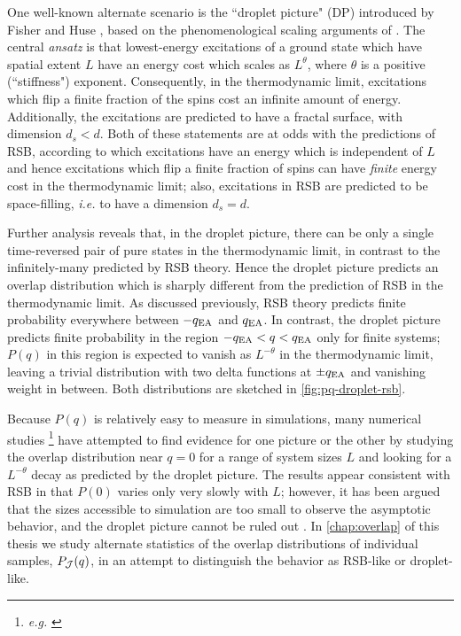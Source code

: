 One well-known alternate scenario is the ``droplet picture" (DP) introduced by
Fisher and Huse
\autocite{fisher1986ordered,fisher1987absence,fisher1988equilibrium},
based on the phenomenological scaling arguments of
\textcite{mcmillan1984scaling}. The central \textit{ansatz} is that
lowest-energy excitations of a ground state which have spatial extent $L$ have
an energy cost which scales as $L^{\theta}$, where $\theta$ is a positive
(``stiffness") exponent. Consequently, in the thermodynamic limit, excitations
which flip a finite fraction of the spins cost an infinite amount of energy.
Additionally, the excitations are predicted to have a fractal surface, with
dimension $d_s<d$. Both of these statements are at odds with the predictions of
RSB, according to which excitations have an energy which is independent of $L$
and hence excitations which flip a finite fraction of spins can have
\emph{finite} energy cost in the thermodynamic limit; also, excitations in RSB
are predicted to be space-filling, \textit{i.e.} to have a dimension $d_s=d$.

Further analysis reveals that, in the droplet picture, there can be only a
single time-reversed pair of pure states in the thermodynamic limit, in
contrast to the infinitely-many predicted by RSB theory. Hence the droplet
picture predicts an overlap distribution which is sharply different from the
prediction of RSB in the thermodynamic limit. As discussed previously, RSB
theory predicts finite probability everywhere between $-q_{\mathrm{EA}}$ and $q_{\mathrm{EA}}$. In
contrast, the droplet picture predicts finite probability in the region
$-q_{\mathrm{EA}}<q<q_{\mathrm{EA}}$ only for finite systems; $P(q)$ in this region is expected to
vanish as $L^{-\theta}$ \autocite{moore1998evidence} in the thermodynamic
limit, leaving a trivial distribution with two delta functions at $\pm q_{\mathrm{EA}}$ and
vanishing weight in between. Both distributions are sketched in
\cref{fig:pq-droplet-rsb}.

Because $P(q)$ is relatively easy to measure in simulations, many numerical
studies%
\footnote{%
  \textit{e.g.}
  \textcite{%
    marinari2000replica,
    reger1990monte,
    katzgraber2001monte,
    katzgraber2003monte,
  }
}
have attempted to find evidence for one picture or the other by studying the
overlap distribution near $q=0$ for a range of system sizes $L$ and looking for
a $L^{-\theta}$ decay as predicted by the droplet picture. The results appear
consistent with RSB in that $P(0)$ varies only very slowly with $L$; however,
it has been argued that the sizes accessible to simulation are too small to
observe the asymptotic behavior, and the droplet picture cannot be ruled out
\autocite{moore1998evidence,middleton2013extracting}. In \cref{chap:overlap}
of this thesis we study alternate statistics of the overlap distributions
of individual samples, $P_{\mathcal{J}}(q)$, in an attempt to distinguish the behavior
as RSB-like or droplet-like.

